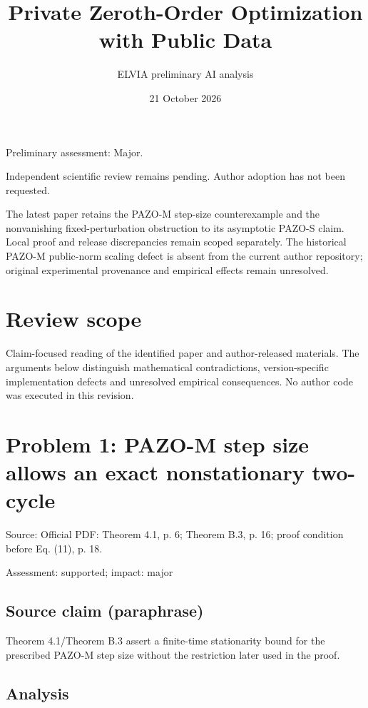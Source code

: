 \documentclass[11pt]{article}
\begin{document}
\title{Private Zeroth-Order Optimization with Public Data}

\author{ELVIA preliminary AI analysis}\date{21 October 2026}\maketitle

Preliminary assessment: Major.\par

Independent scientific review remains pending. Author adoption has not been requested.

The latest paper retains the PAZO-M step-size counterexample and the nonvanishing fixed-perturbation obstruction to its asymptotic PAZO-S claim. Local proof and release discrepancies remain scoped separately. The historical PAZO-M public-norm scaling defect is absent from the current author repository; original experimental provenance and empirical effects remain unresolved.

\section*{Review scope}

Claim-focused reading of the identified paper and author-released materials. The arguments below distinguish mathematical contradictions, version-specific implementation defects and unresolved empirical consequences. No author code was executed in this revision.

\section*{Problem 1: PAZO-M step size allows an exact nonstationary two-cycle}

Source: Official PDF: Theorem 4.1, p. 6; Theorem B.3, p. 16; proof condition before Eq. (11), p. 18.

Assessment: supported; impact: major

\subsection*{Source claim (paraphrase)}

Theorem 4.1/Theorem B.3 assert a finite-time stationarity bound for the prescribed PAZO-M step size without the restriction later used in the proof.

\subsection*{Analysis}
\end{document}
